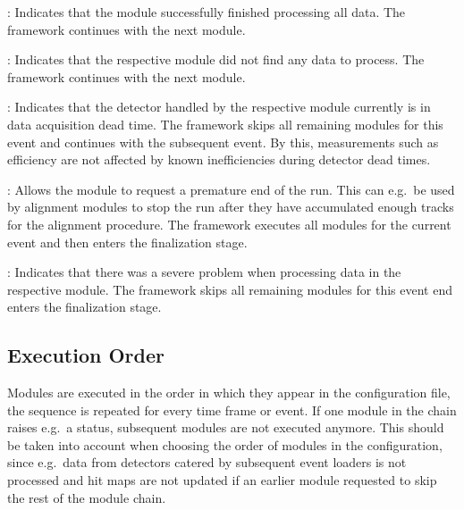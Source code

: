 \begin{description}
    \item{}: Indicates that the module successfully finished processing all data. The framework continues with the next module.
    \item{}: Indicates that the respective module did not find any data to process. The framework continues with the next module.
    \item{}: Indicates that the detector handled by the respective module currently is in data acquisition dead time. The framework skips all remaining modules for this event and continues with the subsequent event. By this, measurements such as efficiency are not affected by known inefficiencies during detector dead times.
    \item{}: Allows the module to request a premature end of the run. This can e.g.\ be used by alignment modules to stop the run after they have accumulated enough tracks for the alignment procedure. The framework executes all modules for the current event and then enters the finalization stage.
    \item{}: Indicates that there was a severe problem when processing data in the respective module. The framework skips all remaining modules for this event end enters the finalization stage.
\end{description}

\subsection{Execution Order}

Modules are executed in the order in which they appear in the configuration file, the sequence is repeated for every time frame or event.
If one module in the chain raises e.g.\ a  status, subsequent modules are not executed anymore.
This should be taken into account when choosing the order of modules in the configuration, since e.g.\ data from detectors catered by subsequent event loaders is not processed and hit maps are not updated if an earlier module requested to skip the rest of the module chain.

